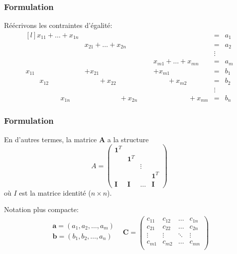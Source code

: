 \documentclass[usepdftitle=false]{beamer}
\def\ba{\boldsymbol{a}}
\def\bb{\boldsymbol{b}}
\def\bA{\boldsymbol{A}}
\def\bC{\boldsymbol{C}}
\def\bI{\boldsymbol{I}}
\def\bone{\boldsymbol{1}}
\begin{document}
\begin{frame}
\frametitle{Formulation}

Réécrivons les contraintes d'égalité:
\[
\begin{matrix}[l]
x_{11} + \ldots + x_{1n} & & & & = & a_1 \\
& x_{21} + \ldots + x_{2n} & & & = &  a_2 \\
& & & & \vdots \\
& & \mbox{ } & x_{m1} + \ldots + x_{mn} & = &  a_m \\
x_{11} & + x_{21} & & + x_{m1} & = & b_1 \\
\quad \quad x_{12} & \quad \quad + x_{22} & & \quad \quad + x_{m2} & = & b_2 \\
& & & & \vdots \\
\quad \quad \quad \qquad x_{1n} &  \quad \quad \quad \qquad +x_{2n} & &  \quad \quad \quad \qquad +x_{mn} & = & b_n 
\end{matrix}
\]

\end{frame}

\begin{frame}
\frametitle{Formulation}

En d'autres termes, la matrice $\bA$ a la structure
\[
A =
\begin{pmatrix}
\bone^T \\
& \bone^T \\
& & \vdots \\
& & & \bone^T \\
\bI & \bI & \ldots & \bI
\end{pmatrix}
\]
où $I$ est la matrice identité ($n \times n$).

\mbox{}

Notation plus compacte:
\[
\begin{matrix}
\begin{matrix}
\ba = (a_1, a_2,\ldots, a_m) \\
\bb = (b_1, b_2,\ldots, a_n) \\
\end{matrix}
&
\bC = 
\begin{pmatrix}
c_{11} & c_{12} & \ldots & c_{1n} \\
c_{21} & c_{22} & \ldots & c_{2n} \\
\vdots & \vdots & \ddots & \vdots \\
c_{m1} & c_{m2} & \ldots & c_{mn} \\
\end{pmatrix}
\end{matrix}
\]

\end{frame}
\end{document}
